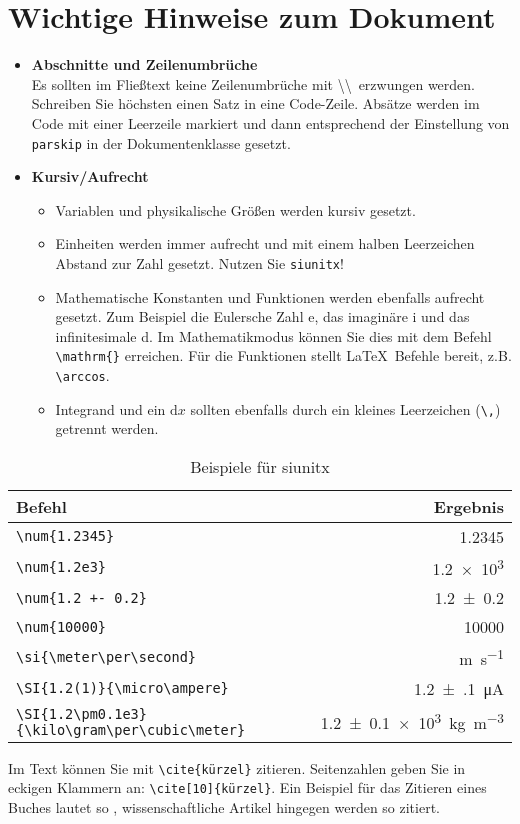 \chapter{Wichtige Hinweise zum Dokument}\label{make}
\begin{itemize}
    \item \textbf{Abschnitte und Zeilenumbrüche} \\
        Es sollten im Fließtext keine Zeilenumbrüche mit \textbackslash\textbackslash \ erzwungen werden.
        Schreiben Sie höchsten einen Satz in eine Code-Zeile.
        Absätze werden im Code mit einer Leerzeile markiert und dann entsprechend der Einstellung von \texttt{parskip} in der Dokumentenklasse gesetzt.
    \item \textbf{Kursiv/Aufrecht} \\
        \begin{itemize}
            \item Variablen und physikalische Größen werden kursiv gesetzt.
            \item Einheiten werden immer aufrecht und mit einem halben Leerzeichen Abstand zur Zahl gesetzt. Nutzen Sie \texttt{siunitx}!
            \item Mathematische Konstanten und Funktionen werden ebenfalls aufrecht gesetzt. Zum Beispiel die Eulersche Zahl e, das imaginäre i und das infinitesimale d.
                Im Mathematikmodus können Sie dies mit dem Befehl \verb_\mathrm{}_ erreichen. Für die Funktionen stellt \LaTeX \ Befehle bereit, z.B. \verb+\arccos+.
            \item Integrand und ein $\mathrm{d}x$ sollten ebenfalls durch ein kleines Leerzeichen (\verb+\,+) getrennt werden.
        \end{itemize}
\end{itemize}
\begin{table}
    \centering
    \caption{Beispiele für siunitx}
    \label{tab:si}
    \begin{tabular}{l r}
        \toprule
        Befehl     &   Ergebnis \\
        \midrule
        \verb+\num{1.2345}+ & \num{1.2345} \\
        \verb+\num{1.2e3}+ & \num{1.2e3} \\
        \verb_\num{1.2 +- 0.2}_ & \num{1.2+-0.2} \\
        \verb+\num{10000}+ & \num{10000} \\
        \verb+\si{\meter\per\second}+ & \si{\meter\per\second} \\
        \verb+\SI{1.2(1)}{\micro\ampere}+ & \SI{1.2(1)}{\micro\ampere} \\
        \verb+\SI{1.2\pm0.1e3}{\kilo\gram\per\cubic\meter}+ & \SI{1.2\pm0.1e3}{\kilo\gram\per\cubic\meter} \\
        \bottomrule
    \end{tabular}
\end{table}
Im Text können Sie mit \verb_\cite{kürzel}_ zitieren. Seitenzahlen geben Sie in eckigen Klammern an:
\verb_\cite[10]{kürzel}_.
Ein Beispiel für das Zitieren eines Buches lautet so \cite{handbook_adhesives},
wissenschaftliche Artikel hingegen werden so \cite{einstein} zitiert.
